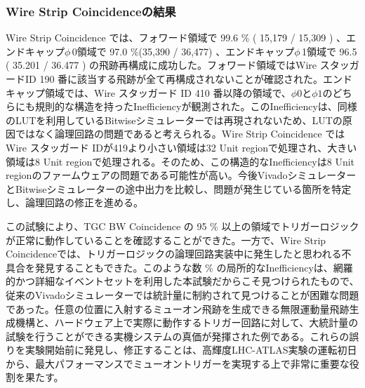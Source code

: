 \subsubsection*{Wire Strip Coincidenceの結果}
Wire Strip Coincidence では、フォワード領域で 99.6 \% ( 15,179 / 15,309 ) 、エンドキャップ$\phi\,$0領域で 97.0 \%(35,390 / 36,477) 、エンドキャップ$\phi\,$1領域で 96.5 ( 35.201 / 36.477 ) の飛跡再構成に成功した。フォワード領域ではWire スタッガードID 190 番に該当する飛跡が全て再構成されないことが確認された。エンドキャップ領域では、Wire スタッガード ID 410 番以降の領域で、$\phi0$と$\phi1$のどちらにも規則的な構造を持ったInefficiencyが観測された。このInefficiencyは、同様のLUTを利用しているBitwiseシミュレーターでは再現されないため、LUTの原因ではなく論理回路の問題であると考えられる。Wire Strip Coincidence ではWire スタッガード IDが419より小さい領域は32 Unit regionで処理され、大きい領域は8 Unit regionで処理される。そのため、この構造的なInefficiencyは8 Unit regionのファームウェアの問題である可能性が高い。今後VivadoシミュレーターとBitwiseシミュレーターの途中出力を比較し、問題が発生じている箇所を特定し、論理回路の修正を進める。

この試験により、TGC BW Coincidence の 95 \% 以上の領域でトリガーロジックが正常に動作していることを確認することができた。一方で、Wire Strip Coincidenceでは、トリガーロジックの論理回路実装中に発生したと思われる不具合を発見することもできた。このような数 \% の局所的なInefficiencyは、網羅的かつ詳細なイベントセットを利用した本試験だからこそ見つけられたもので、従来のVivadoシミュレーターでは統計量に制約されて見つけることが困難な問題であった。任意の位置に入射するミューオン飛跡を生成できる無限運動量飛跡生成機構と、ハードウェア上で実際に動作するトリガー回路に対して、大統計量の試験を行うことができる実機システムの真価が発揮された例である。これらの誤りを実験開始前に発見し、修正することは、高輝度LHC-ATLAS実験の運転初日から、最大パフォーマンスでミューオントリガーを実現する上で非常に重要な役割を果たす。

